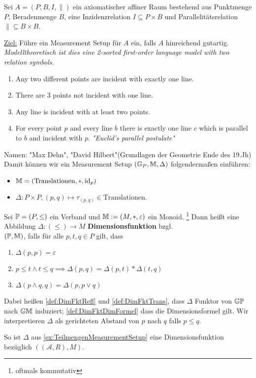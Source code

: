 \begin{beispiel}
    Sei $A = (P,B,I, \parallel)$ ein axiomatischer affiner Raum bestehend aus Punktmenge $P$, Beradenmenge $B$, eine
    Inzidenzrelation $I \subseteq P\times B$ und Parallelitätsrelation ${}\parallel{} \subseteq B \times B$.

    \underline{Ziel:} Führe ein Measurement Setup für $A$ ein, falls $A$ hinreichend gutartig.
    \textit{Modelltheoretisch ist dies eine 2-sorted first-order language model with two relation symbols.}

    \begin{enumerate}[label=(Axiom \arabic{*})]
        \item Any two different points are incident with exactly one line.
        \item There are 3 points not incident with one line.
        \item Any line is incident with at least two points.
        \item For every point $p$ and every line $b$ there is exactly one line $c$ which is parallel to $b$ and incident with $p$.
        \textit{"Euclid's parallel postulate"}
    \end{enumerate}

    Namen: "Max Dehn", "David Hilbert"(Grundlagen der Geometrie Ende des 19.Jh)\nl
    Damit können wir ein Measurement Setup $(\G_P, \M, \Delta)$ folgendermaßen einführen:
    \begin{itemize}
        \item $\M = (\text{Translationen}, \ast, \id_p)$
        \item $\Delta: P\times P, (p,q) \mapsto \tau_{(p,q)} \in \text{Translationen}$.
    \end{itemize}
\end{beispiel}

\begin{definition}[Dimensionsfunktion]
    Sei $\P = (P, \leq)$ ein Verband und $\M := (M, *, \varepsilon)$ ein Monoid.%
    \footnote{oftmals kommutativ}
    Dann heißt eine Abbildung $\Delta\colon (\leq) \to M$ \textbf{Dimensionsfunktion} bzgl.\\$(\P, \M)$, falls für alle $p, t, q\in P$ gilt, dass
    \begin{enumerate}[label=(\arabic*)]
        \item $\Delta(p, p) = \varepsilon$
            \label{def:DimFktRefl}
        \item $p\leq t \land t\leq q \implies \Delta(p, q) = \Delta(p, t) * \Delta(t, q)$
            \label{def:DimFktTrans}
        \item $\Delta(p\land q, q) = \Delta(p, p\lor q)$
            \label{def:DimFktDimFormel}
    \end{enumerate}
    Dabei heißen \ref{def:DimFktRefl} und \ref{def:DimFktTrans}, dass $\Delta$ Funktor von $\G\P$ nach $\G\M$ induziert;
    \ref{def:DimFktDimFormel} dass die Dimensionsformel gilt.
    Wir interpretieren $\Delta$ als gerichteten Abstand von $p$ nach $q$ falls $p\leq q$.
\end{definition}
So ist $\Delta$ aus \autoref{ex:TeilmengenMeasurementSetup} eine Dimensionsfunktion bezüglich $((\mathcal{A}, R), M)$.

